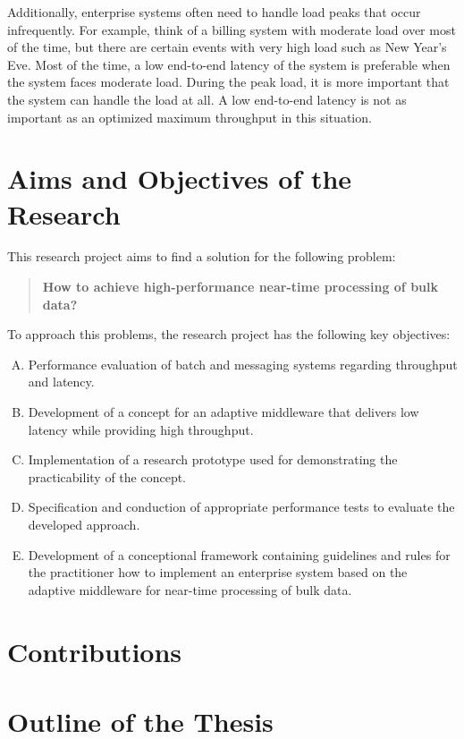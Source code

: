 Additionally, enterprise systems often need to handle load peaks that occur infrequently. For example, think of a billing system with moderate load over most of the time, but there are certain events with very high load such as New Year's Eve. Most of the time, a low end-to-end latency of the system is preferable when the system faces moderate load. During the peak load, it is more important that the system can handle the load at all. A low end-to-end latency is not as important as an optimized maximum throughput in this situation.

\section{Aims and Objectives of the Research}\label{sec:research_objectives}
This research project aims to find a solution for the following problem:
\begin{quote}
\textbf{How to achieve high-performance near-time processing of bulk data?}
\end{quote}
To approach this problems, the research project has the following key objectives:
\begin{enumerate}[A.]
	\item Performance evaluation of batch and messaging systems regarding throughput and latency.
	\item Development of a concept for an adaptive middleware that delivers low latency while providing high throughput.
	\item Implementation of a research prototype used for demonstrating the practicability of the concept.
	\item Specification and conduction of appropriate performance tests to evaluate the developed approach.
	\item Development of a conceptional framework containing guidelines and rules for the practitioner how to implement an enterprise system based on the adaptive middleware for near-time processing of bulk data.
\end{enumerate}

\section{Contributions}\label{sec:contributions}

\section{Outline of the Thesis}\label{sec:thesis_outline}